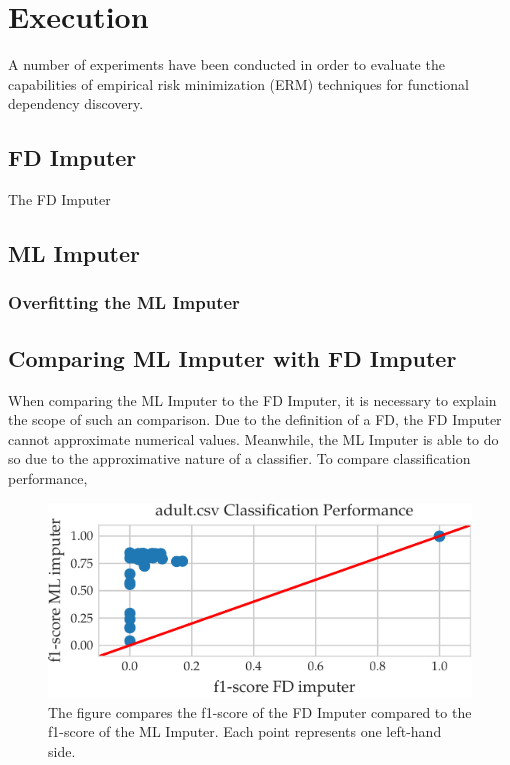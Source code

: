 \newpage
\section{Execution}
A number of experiments have been conducted in order to evaluate the capabilities of empirical risk minimization (ERM) techniques for functional dependency discovery.

\subsection{FD Imputer}
The FD Imputer

\subsection{ML Imputer}

\subsubsection{Overfitting the ML Imputer}

\subsection{Comparing ML Imputer with FD Imputer}
When comparing the ML Imputer to the FD Imputer, it is necessary to explain the scope of such an comparison.
Due to the definition of a FD, the FD Imputer cannot approximate numerical values.
Meanwhile, the ML Imputer is able to do so due to the approximative nature of a classifier.
To compare classification performance,

\begin{figure}[h]
     \centering
     \includegraphics[width=.8\textwidth]{../figures/adult/f1_ml_fd_adult}
     \caption{The figure compares the f1-score of the FD Imputer compared to the f1-score of the ML Imputer. Each point represents one left-hand side.}
     \label{fig:f1_ml_fd_adult}
 \end{figure}

